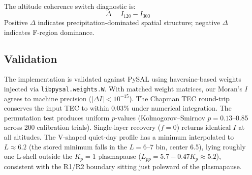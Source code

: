 \documentclass[11pt,letterpaper]{article}
\begin{document}
The altitude coherence switch diagnostic is:
\begin{equation}
\Delta = I_{120} - I_{300}
\label{eq:delta}
\end{equation}
Positive $\Delta$ indicates precipitation-dominated spatial structure; negative
$\Delta$ indicates F-region dominance.

\subsection{Validation}
\label{sec:validation}

The implementation is validated against PySAL \citep{rey2010pysal} using
haversine-based weights injected via \texttt{libpysal.weights.W}. With matched
weight matrices, our Moran's $I$ agrees to machine precision ($|{\Delta I}| <
10^{-15}$). The Chapman TEC round-trip conserves the input TEC to within 0.03\%
under numerical integration. The permutation test produces uniform $p$-values
(Kolmogorov--Smirnov $p = 0.13$--0.85 across 200 calibration trials).
Single-layer recovery ($f = 0$) returns identical $I$ at all altitudes. The
V-shaped quiet-day profile has a minimum interpolated to $L \approx 6.2$ (the
stored minimum falls in the $L = 6$--7 bin, center 6.5), lying roughly one
L-shell outside the \citet{carpenter1992plasmapause} $K_p = 1$ plasmapause
($L_{pp} = 5.7 - 0.47 K_p \approx 5.2$), consistent with the R1/R2 boundary
sitting just poleward of the plasmapause.
\end{document}

